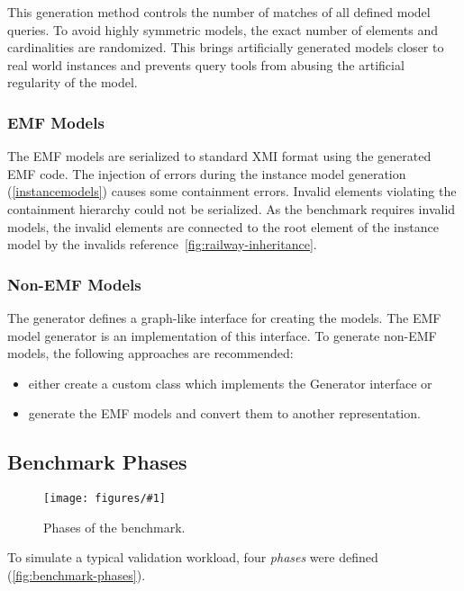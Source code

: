 \documentclass[submission,copyright,creativecommons]{eptcs}
\newcommand{\figref}[1]{\autoref{fig:#1}}
\newcommand{\ttcfig}[2]{
\begin{figure}[htb] 
	\centering
	\texttt{[image: figures/\#1]}
	\caption{#2.}
	\label{fig:#1}
\end{figure}}
\begin{document}
This generation method controls the number of matches of all defined model queries. To avoid highly symmetric models, the exact number of elements and cardinalities are randomized. This brings artificially generated models closer to real world instances and prevents query tools from abusing the artificial regularity of the model. 

\subsubsection{EMF Models}
\label{emf-models}

The EMF models are serialized to standard XMI format using the generated EMF code. The injection of errors during the instance model generation (\autoref{instancemodels}) causes some containment errors. Invalid elements violating the containment hierarchy could not be serialized. As the benchmark requires invalid models, the invalid elements are connected to the root element of the instance model by the \textsf{invalids} reference~\figref{railway-inheritance}.

\subsubsection{Non-EMF Models}

The generator defines a graph-like interface for creating the models. The EMF model generator is an implementation of this interface. To generate non-EMF models, the following approaches are recommended:

\begin{itemize}
  \item either create a custom class which implements the \textsf{Generator} interface or
  \item generate the EMF models and convert them to another representation.
\end{itemize}

\subsection{Benchmark Phases}
\label{sec:phases}

\ttcfig{benchmark-phases}{Phases of the benchmark}

To simulate a typical validation workload, four \emph{phases} were defined (\figref{benchmark-phases}).
\end{document}
